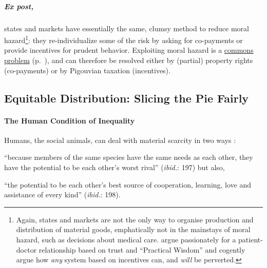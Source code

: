 \subparagraph{Ex post,} states and markets have essentially the same, clumsy method to reduce moral hazard\footnote{
	Again, states and markets are not the only way to organise production and distribution of material goods, emphatically not in the mainstays of moral hazard, such as decisions about medical care. \cite{Schwartz2010} argue passionately for a patient-doctor relationship based on trust and ``Practical Wisdom'' and cogently argue how \emph{any} system based on incentives can, and \emph{will} be perverted.}: 
they re-individualize some of the risk by asking for co-payments or provide incentives for prudent behavior. Exploiting moral hazard is a \hyperref[sec:common-good]{commons problem} (p.~\pageref{sec:common-good}), and can therefore be resolved either by (partial) property rights (co-payments) or by Pigouvian taxation (incentives).

\subsection[Equitable Distribution]{Equitable Distribution: Slicing the Pie Fairly} \label{sec:distribution}

\paragraph{The Human Condition of Inequality}  \label{sec:human-nature-of-inequality} Humans, the social animals, can deal with material scarcity in two ways \citep{Pickett-2009-kx}: \begin{inparaenum}[1)]
	\item ``because members of the same species have the same needs as each other, they have the potential to be each other's worst rival'' (\emph{ibid.}: 197) but also,
	\item ``the potential to be each other's best source of cooperation, learning, love and assistance of every kind'' (\emph{ibid.}: 198). \end{inparaenum}

